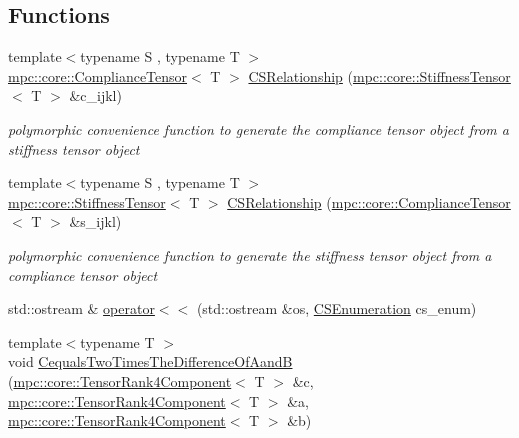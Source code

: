 \subsection*{Functions}
\begin{DoxyCompactItemize}
\item 
{\footnotesize template$<$typename S , typename T $>$ }\\\mbox{\hyperlink{structmpc_1_1core_1_1_compliance_tensor}{mpc\+::core\+::\+Compliance\+Tensor}}$<$ T $>$ \mbox{\hyperlink{namespacempc_1_1core_aa7722f016512fa5a038350eb89fce451}{C\+S\+Relationship}} (\mbox{\hyperlink{structmpc_1_1core_1_1_stiffness_tensor}{mpc\+::core\+::\+Stiffness\+Tensor}}$<$ T $>$ \&c\+\_\+ijkl)
\begin{DoxyCompactList}\small\item\em polymorphic convenience function to generate the compliance tensor object from a stiffness tensor object \end{DoxyCompactList}\item 
{\footnotesize template$<$typename S , typename T $>$ }\\\mbox{\hyperlink{structmpc_1_1core_1_1_stiffness_tensor}{mpc\+::core\+::\+Stiffness\+Tensor}}$<$ T $>$ \mbox{\hyperlink{namespacempc_1_1core_aea25821c5c4e736c92d4ede4d7f3241d}{C\+S\+Relationship}} (\mbox{\hyperlink{structmpc_1_1core_1_1_compliance_tensor}{mpc\+::core\+::\+Compliance\+Tensor}}$<$ T $>$ \&s\+\_\+ijkl)
\begin{DoxyCompactList}\small\item\em polymorphic convenience function to generate the stiffness tensor object from a compliance tensor object \end{DoxyCompactList}\item 
std\+::ostream \& \mbox{\hyperlink{namespacempc_1_1core_a742f3f5b4c1f5b579247c0937bdb6015}{operator$<$$<$}} (std\+::ostream \&os, \mbox{\hyperlink{namespacempc_1_1core_ad3e8e7d43bfc9202d954d999f7d5c991}{C\+S\+Enumeration}} cs\+\_\+enum)
\item 
{\footnotesize template$<$typename T $>$ }\\void \mbox{\hyperlink{namespacempc_1_1core_a243f128e33530a6fca88acd497df1bdd}{Cequals\+Two\+Times\+The\+Difference\+Of\+AandB}} (\mbox{\hyperlink{namespacempc_1_1core_ac3a232afc7c680d580628e834030482f}{mpc\+::core\+::\+Tensor\+Rank4\+Component}}$<$ T $>$ \&c, \mbox{\hyperlink{namespacempc_1_1core_ac3a232afc7c680d580628e834030482f}{mpc\+::core\+::\+Tensor\+Rank4\+Component}}$<$ T $>$ \&a, \mbox{\hyperlink{namespacempc_1_1core_ac3a232afc7c680d580628e834030482f}{mpc\+::core\+::\+Tensor\+Rank4\+Component}}$<$ T $>$ \&b)

\end{DoxyCompactItemize}
